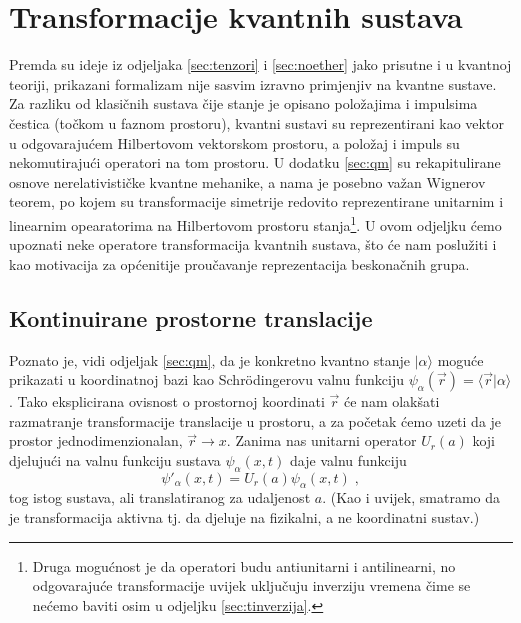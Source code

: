 \section{Transformacije kvantnih sustava}

Premda su ideje iz odjeljaka \ref{sec:tenzori} i \ref{sec:noether}
jako prisutne i u kvantnoj teoriji, prikazani formalizam nije sasvim
izravno primjenjiv na kvantne sustave. Za razliku od klasičnih sustava
čije stanje je opisano položajima i impulsima čestica (točkom u faznom
prostoru), kvantni sustavi su reprezentirani kao vektor
u odgovarajućem Hilbertovom vektorskom prostoru, a položaj i impuls
su nekomutirajući operatori na tom prostoru. U dodatku \ref{sec:qm}
su rekapitulirane osnove nerelativističke kvantne mehanike, a
nama je posebno važan Wignerov teorem, po kojem su transformacije simetrije
redovito reprezentirane unitarnim i linearnim opearatorima na
Hilbertovom prostoru stanja\footnote{Druga mogućnost je da operatori
    budu antiunitarni i antilinearni, no odgovarajuće transformacije
    uvijek uključuju inverziju vremena čime se nećemo baviti osim
u odjeljku \ref{sec:tinverzija}.}.
U ovom odjeljku ćemo upoznati neke operatore transformacija kvantnih
sustava, što će nam poslužiti i kao motivacija za općenitije
proučavanje reprezentacija beskonačnih grupa.

\subsection{Kontinuirane prostorne translacije}

Poznato je, vidi odjeljak \ref{sec:qm}, da je konkretno kvantno stanje
$|\alpha\rangle$ moguće prikazati u koordinatnoj bazi kao Schr\"{o}dingerovu
valnu funkciju $\psi_{\alpha}(\vec{r}) = \langle \vec{r} | \alpha\rangle$.
Tako eksplicirana ovisnost o prostornoj koordinati $\vec{r}$ će nam
olakšati razmatranje transformacije translacije u prostoru, a za početak
ćemo uzeti da je prostor jednodimenzionalan, $\vec{r} \to x$.
Zanima nas unitarni operator $U_{r}(a)$ koji djelujući na valnu
funkciju sustava $\psi_{\alpha}(x, t)$ daje valnu funkciju 
\begin{equation}
  \psi'_{\alpha}(x,t)= U_{r}(a)\psi_{\alpha}(x,t) \;,
\end{equation}
tog istog sustava, ali translatiranog za udaljenost $a$. (Kao i uvijek,
smatramo da je transformacija aktivna tj. da djeluje na fizikalni,
a ne koordinatni sustav.)


